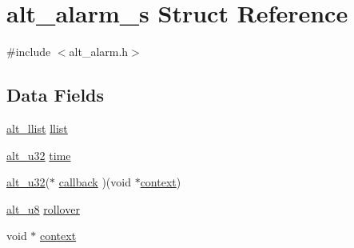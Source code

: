 \hypertarget{structalt__alarm__s}{\section{alt\-\_\-alarm\-\_\-s \-Struct \-Reference}
\label{structalt__alarm__s}
}


{\ttfamily \#include $<$alt\-\_\-alarm.\-h$>$}

\subsection*{\-Data \-Fields}
\begin{DoxyCompactItemize}
\item 
\hyperlink{alt__llist_8h_a94b50b44e6bd512a432af0b840d49aa4}{alt\-\_\-llist} \hyperlink{structalt__alarm__s_a135bc0be285afc59289210771ad9c136}{llist}
\item 
\hyperlink{alt__types_8h_acd6a6a2004f05f01beaa42367510d8af}{alt\-\_\-u32} \hyperlink{structalt__alarm__s_a4e7da19ec56884ee96afc7fdb928cc84}{time}
\item 
\hyperlink{alt__types_8h_acd6a6a2004f05f01beaa42367510d8af}{alt\-\_\-u32}($\ast$ \hyperlink{structalt__alarm__s_a2357171a3a2fc264d0c97105037b86e9}{callback} )(void $\ast$\hyperlink{structalt__alarm__s_ae376f130b17d169ee51be68077a89ed0}{context})
\item 
\hyperlink{alt__types_8h_a760207c0ebacdf5df403cdacd6365a6a}{alt\-\_\-u8} \hyperlink{structalt__alarm__s_abadb320003185a211185e3b1aa460e0e}{rollover}
\item 
void $\ast$ \hyperlink{structalt__alarm__s_ae376f130b17d169ee51be68077a89ed0}{context}
\end{DoxyCompactItemize}


